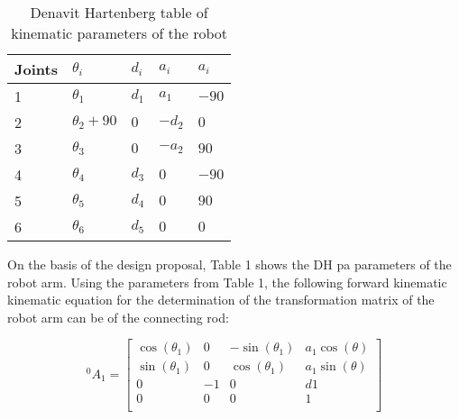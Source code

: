 \begin{table}[H]
	\caption{Denavit Hartenberg table of kinematic parameters of the robot}\label{tab:DH}
	\centering
	\setlength{\tabcolsep}{18pt}
	\begin{tabular}{lllll}
	\hline 
	Joints & $\theta_i$ 	& $d_i$ & $a_i$ & $a_i$ \\ \hline
	1      & $\theta_1$ 	& $d_1$ & $a_1$ & $-90 $ \\
	2      & $\theta_2+90$  & $0  $ & $-d_2$ & $0   $ \\
	3      & $\theta_3$ 	& $0  $ & $-a_2  $ & $90  $ \\
	4      & $\theta_4$ 	& $d_3$ & $0  $ & $-90  $ \\
	5      & $\theta_5$ 	& $d_4$ & $0  $ & $90  $ \\
	6      & $\theta_6$ 	& $d_5$ & $0  $ & $0   $ \\ \hline
	\end{tabular}

	\end{table}


	On the basis of the design proposal, Table 1 shows the DH pa
parameters of the robot arm.
Using the parameters from Table 1, the following forward kinematic
kinematic equation for the determination of the transformation matrix of the robot arm can be
of the connecting rod:

\[
	{}^{0}_{}A_1 = \begin{bmatrix}
	\cos(\theta_1)& 0& -\sin(\theta_1)  & a_1\cos(\theta) \\
	\sin(\theta_1)& 0 & \cos(\theta_1) & a_1\sin(\theta) \\
	0 & -1 & 0 & d1 \\
	0 & 0 & 0 & 1 \\
\end{bmatrix}
\]

